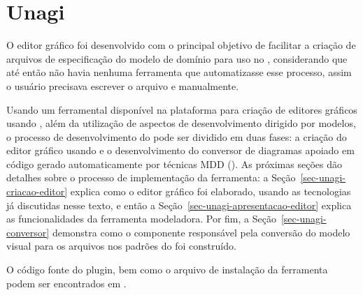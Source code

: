 \chapter{Unagi}
\label{sec-unagi}

O editor gráfico \unagi foi desenvolvido com o principal objetivo de facilitar a criação de arquivos de especificação do modelo de domínio para uso no \zanshin, considerando que até então não havia nenhuma ferramenta que automatizasse esse processo, assim o usuário precisava escrever o arquivo \xml e \ecore manualmente. 

Usando um ferramental disponível na plataforma \eclipse para criação de editores gráficos usando \emf, além da utilização de aspectos de desenvolvimento dirigido por modelos, o processo de desenvolvimento do \unagi pode ser dividido em duas fases: a criação do editor gráfico usando \sirius e o desenvolvimento do conversor de diagramas apoiado em código gerado automaticamente por técnicas MDD (\mdd). As próximas seções dão detalhes sobre o processo de implementação da ferramenta: a Seção~\ref{sec-unagi-criacao-editor} explica como o editor gráfico foi elaborado, usando as tecnologias já discutidas nesse texto, e então a Seção~\ref{sec-unagi-apresentacao-editor} explica as funcionalidades da ferramenta modeladora. Por fim, a Seção~\ref{sec-unagi-conversor} demonstra como o componente responsável pela conversão do modelo visual para os arquivos nos padrões do \zanshin foi construído.

O código fonte do plugin, bem como o arquivo de instalação da ferramenta podem ser encontrados em \codigoUnagi.

